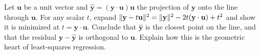 \begin{exercise}
\label{chAcla:exr-projection-proof}
Let $\mathbf{u}$ be a unit vector and $\hat{\mathbf{y}}=(\mathbf{y}\cdot\mathbf{u})\mathbf{u}$ the
projection of $\mathbf{y}$ onto the line through $\mathbf{u}$. For any scalar $t$, expand
$\lVert\mathbf{y}-t\mathbf{u}\rVert^2 = \lVert\mathbf{y}\rVert^2 - 2t(\mathbf{y}\cdot\mathbf{u}) + t^2$ and show
it is minimized at $t=\mathbf{y}\cdot\mathbf{u}$. Conclude that $\hat{\mathbf{y}}$ is the closest point
on the line, and that the residual $\mathbf{y}-\hat{\mathbf{y}}$ is orthogonal to $\mathbf{u}$.
Explain how this is the geometric heart of least-squares regression.
\end{exercise}
